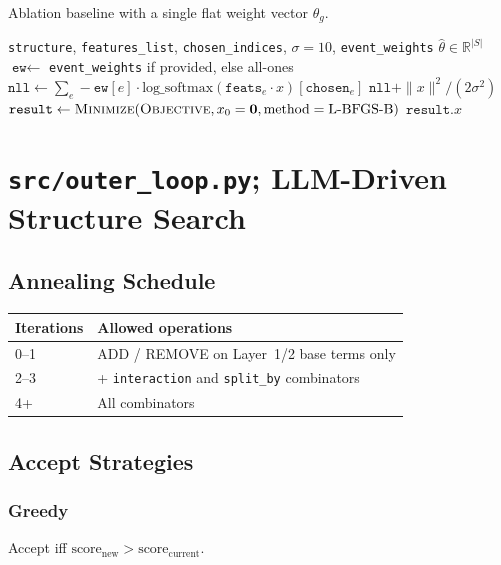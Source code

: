 \documentclass[11pt,a4paper]{article}
\begin{document}
Ablation baseline with a single flat weight vector $\theta_g$.

\begin{algorithm}[H]
\caption{\textsc{FitWeightsNoHierarchy}}\label{alg:fit-flat}
\begin{algorithmic}[1]
\Require \texttt{structure}, \texttt{features\_list}, \texttt{chosen\_indices}, $\sigma{=}10$, \texttt{event\_weights}
\Ensure $\hat\theta \in \mathbb{R}^{|S|}$
\State $\texttt{ew} \gets$ \texttt{event\_weights} if provided, else all-ones
    \State $\texttt{nll} \gets \sum_e -\texttt{ew}[e] \cdot \text{log\_softmax}(\texttt{feats}_e \cdot x)[\texttt{chosen}_e]$
    \State \Return $\texttt{nll} + \|x\|^2 / (2\sigma^2)$
\EndFunction
\State $\texttt{result} \gets \Call{Minimize}{\textsc{Objective}, x_0 = \mathbf{0}, \text{method}=\text{L-BFGS-B}}$
\State \Return $\texttt{result}.x$
\end{algorithmic}
\end{algorithm}


\section{\texttt{src/outer\_loop.py}; LLM-Driven Structure Search}
\label{sec:outer-loop}

\subsection{Annealing Schedule}

\begin{table}[H]\centering
\begin{tabular}{ll}
\toprule
Iterations & Allowed operations \\
\midrule
0--1 & ADD / REMOVE on Layer~1/2 base terms only \\
2--3 & + \texttt{interaction} and \texttt{split\_by} combinators \\
4+   & All combinators \\
\bottomrule
\end{tabular}
\end{table}

\subsection{Accept Strategies}

\subsubsection{Greedy}
Accept iff $\text{score}_{\text{new}} > \text{score}_{\text{current}}$.
\end{document}
